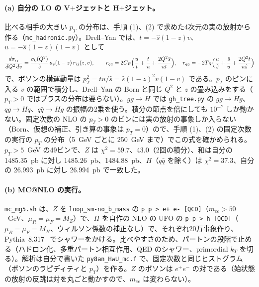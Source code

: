 \documentclass[a4paper,10pt]{ltjsarticle}
\begin{document}
\paragraph{(a) 自分の LO の V$+$ジェットと H$+$ジェット。}比べる相手の大きい $p_T$ の分布は、手順 (1)、(2) で求めた4次元の実の放射から作る（\texttt{mc\_hadronic.py}）。Drell--Yan では、$t=-\hat s(1-z)v$、$u=-\hat s(1-z)(1-v)$ として
\[
\frac{d\sigma_{ij}}{dQ^2\,dv}=\frac{\sigma_0(Q^2)}{\hat s}\,a_s(1-z)\,r_{ij}(z,v),\qquad r_{q\bar q}=2C_F\Bigl(\frac ut+\frac tu+\frac{2Q^2\hat s}{ut}\Bigr),\quad r_{qg}=-2T_R\Bigl(\frac u{\hat s}+\frac{\hat s}u+\frac{2Q^2t}{u\hat s}\Bigr)
\]
で、ボソンの横運動量は $p_T^2=tu/\hat s=\hat s(1-z)^2v(1-v)$ である。$p_T$ のビンに入る $v$ の範囲で積分し、Drell--Yan の Born と同じ $Q^2$ と $z$ の畳み込みをする（$p_T>0$ ではプラスの分布は要らない）。$gg\to H$ では \texttt{gh\_tree.py} の $gg\to Hg$、$qg\to Hq$、$q\bar q\to Hg$ の振幅の2乗を使う。積分の節点を倍にしても $10^{-7}$ しか動かない。固定次数の NLO の $p_T>0$ のビンには実の放射の事象しか入らない（Born、仮想の補正、引き算の事象は $p_T=0$）ので、手順 (1)、(2) の固定次数の実行の $p_T$ の分布（5~GeV ごとに 250~GeV まで）でこの式を確かめられる。$p_T>5$~GeV の49ビンで、$Z$ は $\chi^2=59.7$、43.0（2回の積分）、和は自分の 1485.35~pb に対し 1485.26~pb、1484.88~pb、$H$（$q\bar q$ を除く）は $\chi^2=37.3$、自分の 26.993~pb に対し 26.994~pb で一致した。

\paragraph{(b) MC@NLO の実行。}\texttt{mc\_mg5.sh} は、$Z$ を \texttt{loop\_sm-no\_b\_mass} の \texttt{p p > e+ e- [QCD]}（$m_{ee}>50$~GeV、$\mu_R=\mu_F=M_Z$）で、$H$ を自作の NLO の UFO の \texttt{p p > h [QCD]}（$\mu_R=\mu_F=M_H$、ウィルソン係数の補正なし）で、それぞれ20万事象作り、Pythia~8.317~\cite{pythia83} でシャワーをかける。比べやすさのため、パートンの段階で止める（ハドロン化、多重パートン相互作用、QED のシャワー、primordial $k_T$ を切る）。解析は自分で書いた \texttt{py8an\_HwU\_mc.f} で、固定次数と同じヒストグラム（ボソンのラピディティと $p_T$）を作る。$Z$ のボソンは $e^+e^-$ の対である（始状態の放射の反跳は対を丸ごと動かすので、$m_{ee}$ は変わらない）。
\end{document}

